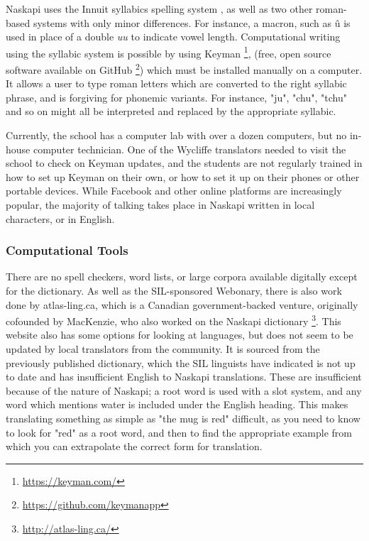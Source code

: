 \documentclass[10pt, a4paper]{article}
\begin{document}
Naskapi uses the Innuit syllabics spelling system \cite{wals-141},
as well as two other roman-based systems with only minor differences. For instance, a macron, such as \^u is used in place of a double \emph{uu} to indicate vowel length. Computational writing using the syllabic system is possible by using Keyman \footnote{\href{https://keyman.com/}{https://keyman.com/}}, (free, open source software available on GitHub \footnote{\href{https://github.com/keymanapp}{https://github.com/keymanapp}})
which must be installed manually on a computer. It allows a user to type roman letters which are converted to the right syllabic phrase, and is forgiving for phonemic variants. For instance, "ju", "chu", "tchu" and so on might all be interpreted and replaced by the appropriate syllabic. %

Currently, the school has a computer lab with over a dozen computers, but no in-house computer technician. One of the Wycliffe translators needed to visit the school to check on Keyman updates, and the students are not regularly trained in how to set up Keyman on their own, or how to set it up on their phones or other portable devices. While Facebook and other online platforms are increasingly popular, the majority of talking takes place in Naskapi written in local characters, or in English.

\subsubsection{Computational Tools}
There are no spell checkers, word lists, or large corpora available digitally except for the dictionary. As well as the SIL-sponsored Webonary, there is also work done by atlas-ling.ca, which is a Canadian government-backed venture, originally cofounded by MacKenzie, who also worked on the Naskapi dictionary \footnote{\href{http://atlas-ling.ca/}{http://atlas-ling.ca/}}.
This website also has some options for looking at languages, but does not seem to be updated by local translators from the community. It is sourced from the previously published dictionary, which the SIL linguists have indicated is not up to date and has insufficient English to Naskapi translations. These are insufficient because of the nature of Naskapi; a root word is used with a slot system, and any word which mentions water is included under the English heading. This makes translating something as simple as "the mug is red" difficult, as you need to know to look for "red" as a root word, and then to find the appropriate example from which you can extrapolate the correct form for translation.
\end{document}
